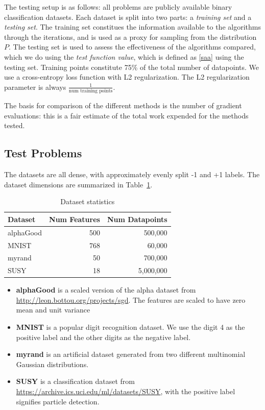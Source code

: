 \documentclass[11pt]{article}
\begin{document}
 
 The testing setup is as follows: all problems are publicly available binary classification datasets. Each dataset is split into two parts: a \emph{training set} and a \emph{testing set}. The training set constitues the information available to the algorithms through the iterations, and is used as a proxy for sampling from the distribution $P$. The testing set is used to assess the effectiveness of the algorithms compared, which we do using the \emph{test function value}, which is defined as \eqref{saa} using the testing set. Training points constitute 75\% of the total number of datapoints. We use a cross-entropy loss function with L2 regularization. The L2 regularization parameter is always $\frac{1}{\mbox{num training points}}$.

 The basis for comparison of the different methods is the number of gradient evaluations: this is a fair estimate of the total work expended for the methods tested.
 
   \subsection{Test Problems}

The datasets are all dense, with approximately evenly split -1 and +1 labels. The dataset dimensions are summarized in Table~\ref{table:sizes}.

\begin{table}[htb!]	%
	\centering
	\begin{tabular}{lrr}
		\toprule
		\textbf{Dataset} & \textbf{Num Features} & \textbf{Num Datapoints}\\
		\midrule
		             alphaGood &              500 &              500,000\\
		             MNIST &              768 &              60,000\\
		             myrand &              50 &              700,000\\
		             SUSY &              18 &              5,000,000\\
		\bottomrule
	\end{tabular}
	\caption{Dataset statistics}
	\label{table:sizes}
\end{table}

\begin{itemize}
	\item \textbf{alphaGood} is a scaled version of the alpha dataset from \url{http://leon.bottou.org/projects/sgd}. The features are scaled to have zero mean and unit variance
	\item \textbf{MNIST} is a popular digit recognition dataset. We use the digit 4 as the positive label and the other digits as the negative label. 
	\item \textbf{myrand} is an artificial dataset generated from two different multinomial Gaussian distributions. 
	\item  \textbf{SUSY} is a classification dataset from \url{https://archive.ics.uci.edu/ml/datasets/SUSY}, with the positive label signifies particle detection. 
\end{itemize}
\end{document}
